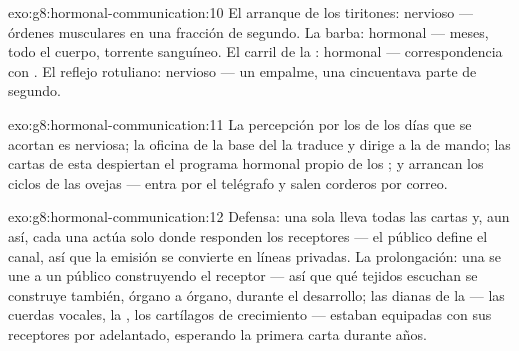 \begin{solution}{exo:g8:hormonal-communication:10}
El arranque de los tiritones: nervioso --- órdenes musculares en una
fracción de segundo. La barba: hormonal --- meses, todo el cuerpo,
torrente sanguíneo. El carril de la : hormonal ---
correspondencia con . El reflejo rotuliano: nervioso
--- un empalme, una cincuentava parte de segundo.
\end{solution}

\begin{solution}{exo:g8:hormonal-communication:11}
La percepción por los  de los días que se acortan es nerviosa; la
oficina de la base del  la traduce y dirige a la  de
mando; las cartas de esta despiertan el programa hormonal propio de los
; y arrancan los ciclos de las ovejas --- entra  por el
telégrafo y salen corderos por correo.
\end{solution}

\begin{solution}{exo:g8:hormonal-communication:12}
Defensa: una sola  lleva todas las cartas y, aun así, cada una
actúa solo donde responden los receptores --- el público define el
canal, así que la emisión se convierte en líneas privadas. La
prolongación: una  se une a un público construyendo el receptor
--- así que qué tejidos escuchan se construye también, órgano a órgano,
durante el desarrollo; las dianas de la  --- las cuerdas
vocales, la , los cartílagos de crecimiento --- estaban equipadas
con sus receptores por adelantado, esperando la primera carta durante
años.
\end{solution}

